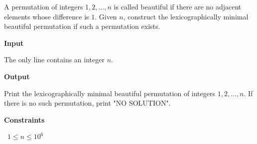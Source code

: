 A permutation of integers $1,2,\ldots,n$ is called beautiful if there are no adjacent elements whose difference is $1$.
Given $n$, construct the lexicographically minimal beautiful permutation if such a permutation exists.

\vspace{0.3cm}\noindent\textbf{Input}

The only line contains an integer $n$.

\vspace{0.3cm}\noindent\textbf{Output}

Print the lexicographically minimal beautiful permutation of integers $1,2,\ldots,n$. If there is no such permutation, print "NO SOLUTION".

\vspace{0.3cm}\noindent\textbf{Constraints}

\textbullet\ $1 \le n \le 10^6$
